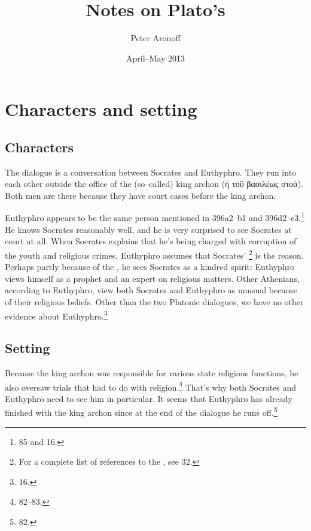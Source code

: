 \documentclass[11pt]{article}
\begin{document}
\begin{titlepage}
\title{Notes on Plato's }
\author{Peter Aronoff}
\date{April--May 2013}
\maketitle
\end{titlepage}

\section{Characters and setting}

\subsection{Characters}

The dialogue is a conversation between Socrates and Euthyphro.  They run into each other outside the office of the (so--called) king archon ({\g ἡ τοῦ βασιλέως στοά}).  Both men are there because they have court cases before the king archon.

Euthyphro appears to be the same person mentioned in  396a2--b1 and 396d2--e3.\footnote{\citet{burnet1924} 85 and \citet{bailly2003} 16.}  He knows Socrates reasonably well, and he is very surprised to see Socrates at court at all.  When Socrates explains that he's being charged with corruption of the youth and religious crimes, Euthyphro assumes that Socrates' \footnote{For a complete list of references to the , see \citet{bailly2003} 32.} is the reason.  Perhaps partly because of the , he sees Socrates as a kindred spirit: Euthyphro views himself as a prophet and an expert on religious matters.  Other Athenians, according to Euthyphro, view both Socrates and Euthyphro as unusual because of their religious beliefs.  Other than the two Platonic dialogues, we have no other evidence about Euthyphro.\footnote{\citet{bailly2003} 16.}

\subsection{Setting}

Because the king archon was responsible for various state religious functions, he also oversaw trials that had to do with religion.\footnote{\citet{burnet1924} 82--83.}  That's why both Socrates and Euthyphro need to see him in particular.  It seems that Euthyphro has already finished with the king archon since at the end of the dialogue he runs off.\footnote{\citet{burnet1924} 82.}
\end{document}
